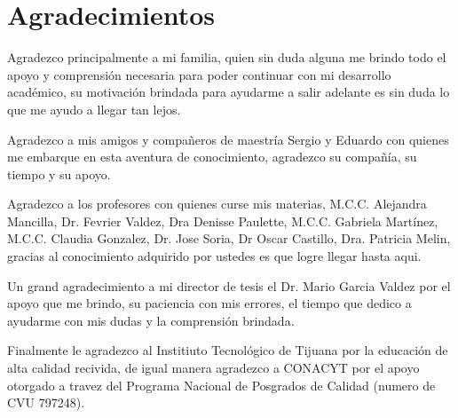\clearpage

\section*{Agradecimientos}

Agradezco principalmente a mi familia, quien sin duda alguna me brindo todo el
apoyo y comprensión necesaria para poder continuar con mi desarrollo académico,
su motivación brindada para ayudarme a salir adelante es sin duda lo que me
ayudo a llegar tan lejos.

Agradezco a mis amigos y compañeros de maestría Sergio y Eduardo con quienes me
embarque en esta aventura de conocimiento, agradezco su compañía, su tiempo y su
apoyo.

Agradezco a los profesores con quienes curse mis materias, M.C.C. Alejandra
Mancilla, Dr. Fevrier Valdez, Dra Denisse Paulette, M.C.C. Gabriela Martínez,
M.C.C. Claudia Gonzalez, Dr. Jose Soria, Dr Oscar Castillo, Dra. Patricia Melin,
gracias al conocimiento adquirido por ustedes es que logre llegar hasta aqui.

Un grand agradecimiento a mi director de tesis el Dr. Mario Garcia Valdez por el
apoyo que me brindo, su paciencia con mis errores, el tiempo que dedico a
ayudarme con mis dudas y la comprensión brindada.

Finalmente le agradezco al Institiuto Tecnológico de Tijuana por la educación de
alta calidad recivida, de igual manera agradezco a CONACYT por el apoyo otorgado
a travez del Programa Nacional de Posgrados de Calidad (numero de CVU 797248).


